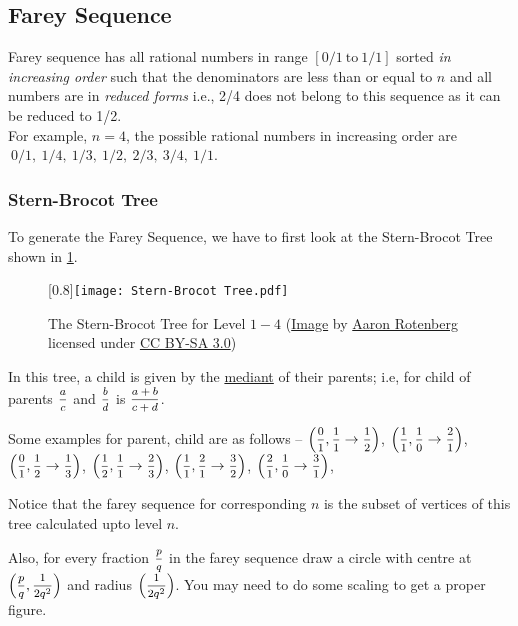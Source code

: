 \documentclass[../../Problems]{subfiles}
\begin{document}
\recalctypearea
\subsection{Farey Sequence}{\label{pp:fareysequence}}
Farey sequence has all rational numbers in range $[0/1\ \text{to}\ 1/1]$ sorted \emph{in increasing order} such that the denominators are less than or equal to $n$ and all numbers are in \emph{reduced forms} i.e., 2/4 does not belong to this sequence as it can be reduced to 1/2.\\
For example, $n=4$, the possible rational numbers in increasing order are $\ 0/1,\ 1/4,\ 1/3,\ 1/2,\ 2/3,\ 3/4,\ 1/1$.
\vspace{-1em}
\subsubsection*{Stern-Brocot Tree}
\vspace{-0.7em}
To generate the Farey Sequence, we have to first look at the {Stern-Brocot Tree} shown in \ref{fig:sternbrocottree}.
\begin{figure}[H]
	\centering
	\scalebox{1}[0.8]{\texttt{[image: Stern-Brocot Tree.pdf]}}
	\caption{The Stern-Brocot Tree for Level $1-4$ (\href{https://commons.wikimedia.org/wiki/File:SternBrocotTree.svg}{Image} by \href{https://commons.wikimedia.org/wiki/User:Aaron_Rotenberg}{Aaron Rotenberg} licensed under \href{https://creativecommons.org/licenses/by-sa/3.0/}{CC BY-SA 3.0})}
	\label{fig:sternbrocottree}
\end{figure}
In this tree, a child is given by the \href{https://en.wikipedia.org/wiki/Mediant_(mathematics)}{mediant} of their parents; i.e, for child of parents $\mfrac{a}{c}$ and $\mfrac{b}{d}$ is $\mfrac{a+b}{c+d}$.

Some examples for parent, child are as follows -- $\left(\mfrac{0}{1}, \mfrac{1}{1} \rightarrow \mfrac{1}{2}\right)$, $\left(\mfrac{1}{1}, \mfrac{1}{0} \rightarrow \mfrac{2}{1}\right)$, $\left(\mfrac{0}{1}, \mfrac{1}{2} \rightarrow \mfrac{1}{3}\right)$, $\left(\mfrac{1}{2}, \mfrac{1}{1} \rightarrow \mfrac{2}{3}\right)$, $\left(\mfrac{1}{1}, \mfrac{2}{1} \rightarrow \mfrac{3}{2}\right)$, $\left(\mfrac{2}{1}, \mfrac{1}{0} \rightarrow \mfrac{3}{1}\right)$,

Notice that the farey sequence for corresponding $n$ is the subset of vertices of this tree calculated upto level $n$.

Also, for every fraction $\mfrac{p}{q}$ in the farey sequence draw a circle with centre at $\left(\mfrac{p}{q}, \mfrac{1}{2q^2}\right)$ and radius $\left(\mfrac{1}{2q^2}\right)$. You may need to do some scaling to get a proper figure.
\end{document}
